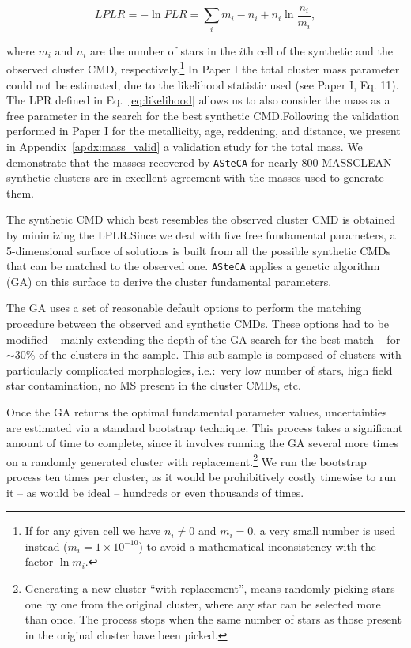 \documentclass[draft]{aa}
\begin{document}
\begin{equation}
LPLR  = -\ln PLR = \sum_i m_i - n_i + n_i \ln \frac{n_i}{m_i},
\label{eq:likelihood}
\end{equation}

\noindent where $m_i$ and $n_i$ are the number of stars in the $i$th cell of
the synthetic and the observed cluster CMD, respectively.\footnote{If for any
given cell we have $n_i\neq0$ and $m_i=0$, a very small number is used instead 
($m_i=1{\times}10^{-10}$) to avoid a mathematical inconsistency with the factor
$\ln m_i$.}
%
In Paper I the total cluster mass parameter could not be estimated, due to the
likelihood statistic used (see Paper I, Eq. 11). The LPR defined in
Eq.~\ref{eq:likelihood} allows us to also consider the mass as a free parameter
in the search for the best synthetic CMD.\@ Following the validation performed
in Paper I for the metallicity, age, reddening, and distance, we present in
Appendix~\ref{apdx:mass_valid} a validation study for the total mass. We
demonstrate that the masses recovered by \texttt{ASteCA} for nearly 800
MASSCLEAN synthetic clusters are in excellent agreement with the masses
used to generate them.

The synthetic CMD which best resembles the observed cluster CMD is obtained by
minimizing the LPLR.\@ Since we deal with five free fundamental parameters, a
5-dimensional surface of solutions is built from all the possible synthetic CMDs
that can be matched to the observed one.
%
\texttt{ASteCA} applies a genetic algorithm (GA) on this surface to derive the
cluster fundamental parameters.

The GA uses a set of reasonable default options to perform the matching
procedure between the observed and synthetic CMDs. These options had to be
modified -- mainly extending the depth of the GA search for the best match --
for $\sim$30\% of the clusters in the sample. This sub-sample is composed of
clusters with particularly complicated morphologies, i.e.:\ very low number of
stars, high field star contamination, no MS present in the cluster CMDs, etc.

Once the GA returns the optimal fundamental parameter values,
uncertainties are estimated via a standard bootstrap technique. This process
takes a significant amount of time to complete, since it involves running the GA
several more times on a randomly generated cluster with
replacement.\footnote{Generating a new cluster ``with replacement'', means randomly
picking stars one by one from the original cluster, where any star can be selected
more than once. The process stops when the same number of stars as those present
in the original cluster have been picked.}
We run the bootstrap process ten times per cluster, as it would be prohibitively
costly timewise to run it -- as would be ideal -- hundreds or even thousands of
times.
\end{document}
